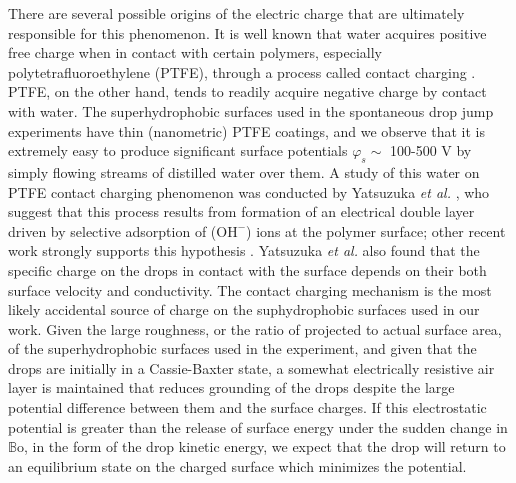 \documentclass[12pt,a4paper,oneside]{book}
\begin{document}
There are several possible origins of the electric charge that are ultimately responsible for this phenomenon. It is well known that water acquires positive free charge when in contact with certain polymers, especially polytetrafluoroethylene (PTFE), through a process called contact charging \cite{langmuir_surface_1938}. PTFE, on the other hand, tends to readily acquire negative charge by contact with water. The superhydrophobic surfaces used in the spontaneous drop jump experiments have thin (nanometric) PTFE coatings, and we observe that it is extremely easy to produce significant surface potentials $\varphi_s \sim$ 100-500 V by simply flowing streams of distilled water over them. A study of this water on PTFE contact charging phenomenon was conducted by Yatsuzuka \emph{et al.} \cite{yatsuzuka_electrification_1994}, who suggest that this process results from formation of an electrical double layer driven by selective adsorption of ($\mbox{OH}^-$) ions at the polymer surface; other recent work strongly supports this hypothesis \cite{beattie_intrinsic_2006, strazdaite_water_2015}. Yatsuzuka \emph{et al.} also found that the specific charge on the drops in contact with the surface depends on their both surface velocity and conductivity. The contact charging mechanism is the most likely accidental source of charge on the suphydrophobic surfaces used in our work. Given the large roughness, or the ratio of projected to actual surface area, of the superhydrophobic surfaces used in the experiment, and given that the drops are initially in a Cassie-Baxter state, a somewhat electrically resistive air layer is maintained that reduces grounding of the drops despite the large potential difference between them and the surface charges. If this electrostatic potential is greater than the release of surface energy under the sudden change in $\mathbb{B}\mbox{o}$, in the form of the drop kinetic energy, we expect that the drop will return to an equilibrium state on the charged surface which minimizes the potential.
\end{document}
